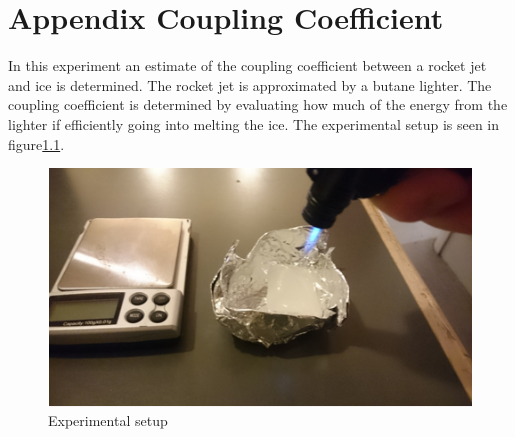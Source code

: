 \chapter{Appendix Coupling Coefficient}\label{app:coupling}

In this experiment an estimate of the coupling coefficient between a rocket jet and ice is determined. The rocket jet is approximated by a butane lighter. The coupling coefficient is determined by evaluating how much of the energy from the lighter if efficiently going into melting the ice. The experimental setup is seen in figure\ref{fig:coupling}.

\begin{figure}[htb]
\begin{center}
\includegraphics[scale=0.8]{figures/navtheory/coupling}
\caption{Experimental setup}
\label{fig:coupling}
\end{center}
\end{figure}


